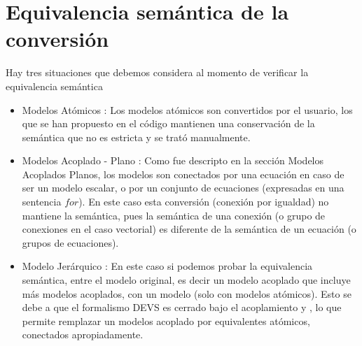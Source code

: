 \section{Equivalencia semántica de la conversión}
Hay tres situaciones que debemos considera al momento de verificar la equivalencia semántica
\begin{itemize}
\item Modelos Atómicos : Los modelos atómicos son convertidos por el usuario, los que se han propuesto en el código mantienen una conservación de la semántica que no es estricta y se trató manualmente. 
\item Modelos Acoplado - Plano : Como fue descripto en la sección Modelos Acoplados Planos, los modelos son conectados por una ecuación en caso de ser un modelo escalar, o por un conjunto de ecuaciones (expresadas en una sentencia $for$). En este caso esta conversión (conexión por igualdad) no mantiene la semántica, pues la semántica de una conexión (o grupo de conexiones en el caso vectorial) es diferente de la semántica de un ecuación (o grupos de ecuaciones).

\item Modelo Jerárquico : En este caso si podemos probar la equivalencia semántica, entre el modelo original, es decir un modelo acoplado que incluye más modelos acoplados, con un modelo  (solo con modelos atómicos). Esto se debe a que el formalismo DEVS es cerrado bajo el acoplamiento \cite{Zeigler:2000:TMS:580780} y \cite{zeigler1984multifacetted}, lo que permite remplazar un modelos acoplado por equivalentes atómicos, conectados apropiadamente.
\end{itemize}
